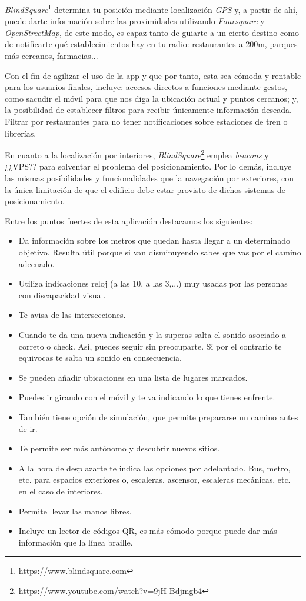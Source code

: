 \textit{BlindSquare}\footnote{\url{https://www.blindsquare.com}} determina tu posición mediante localización \textit{GPS} y, a partir de ahí, puede darte información sobre las proximidades utilizando \textit{Foursquare} y \textit{OpenStreetMap}, de este modo, es capaz tanto de guiarte a un cierto destino como de notificarte qué establecimientos hay en tu radio: restaurantes a 200m, parques más cercanos, farmacias...

Con el fin de agilizar el uso de la app y que por tanto, esta sea cómoda y rentable para los usuarios finales, incluye: accesos directos a funciones mediante gestos, como sacudir el móvil para que nos diga la ubicación actual y puntos cercanos; y, la posibilidad de establecer filtros para recibir únicamente información deseada. Filtrar por restaurantes para no tener notificaciones sobre estaciones de tren o librerías.

En cuanto a la localización por interiores, \textit{BlindSquare}\footnote{\url{https://www.youtube.com/watch?v=9jH-Bdjmgb4}} emplea \textit{beacons} y ¿¿VPS?? para solventar el problema del posicionamiento. Por lo demás, incluye las mismas posibilidades y funcionalidades que la navegación por exteriores, con la única limitación de que el edificio debe estar provisto de dichos sistemas de posicionamiento.

Entre los puntos fuertes de esta aplicación destacamos los siguientes:
\begin{itemize}
	\item Da información sobre los metros que quedan hasta llegar a un determinado objetivo. Resulta útil porque si van disminuyendo sabes que vas por el camino adecuado.
	\item Utiliza indicaciones reloj (a las 10, a las 3,...) muy usadas por las personas con discapacidad visual.
	\item Te avisa de las intersecciones. 
	\item Cuando te da una nueva indicación y la superas salta el sonido asociado a correto o check. Así, puedes seguir sin preocuparte. Si por el contrario te equivocas te salta un sonido en consecuencia.
	\item Se pueden añadir ubicaciones en una lista de lugares marcados.
	\item Puedes ir girando con el móvil y te va indicando lo que tienes enfrente. 
	\item También tiene opción de simulación, que permite prepararse un camino antes de ir.
	\item Te permite ser más autónomo y descubrir nuevos sitios.
	\item A la hora de desplazarte te indica las opciones por adelantado. Bus, metro, etc. para espacios exteriores o, escaleras, ascensor, escaleras mecánicas, etc. en el caso de interiores.
	\item Permite llevar las manos libres.
	\item Incluye un lector de códigos QR, es más cómodo porque puede dar más información que la línea braille.
\end{itemize}

